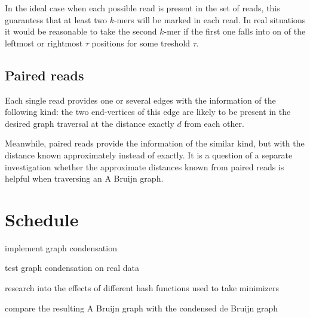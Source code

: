 \documentclass[12pt]{article}
\begin{document}
In the ideal case when each possible read is present in the set of reads, this guarantess that
at least two $k$-mers will be marked in each read.
In real situations it would be reasonable to take the second $k$-mer if the first one
falls into on of the leftmost or rightmost $\tau$ positions for some treshold $\tau$.

\subsection{Paired reads}

Each single read provides one or several edges with the information of the following kind:
the two end-vertices of this edge are likely to be present in the desired graph traversal
at the distance exactly $d$ from each other.

Meanwhile, paired reads provide the information of the similar kind, but with the distance
known approximately instead of exactly.
It is a question of a separate investigation whether the approximate distances known from
paired reads is helpful when traversing an A Bruijn graph.

\section{Schedule}

\begin{description}
  \item[April 10] implement graph condensation
  \item[April 17] test graph condensation on real data
  \item[April 30] research into the effects of different hash functions 
  used to take minimizers
  \item[May 10] compare the resulting A Bruijn graph with the condensed de 
  Bruijn graph
  \item 
\end{description}
\end{document}
